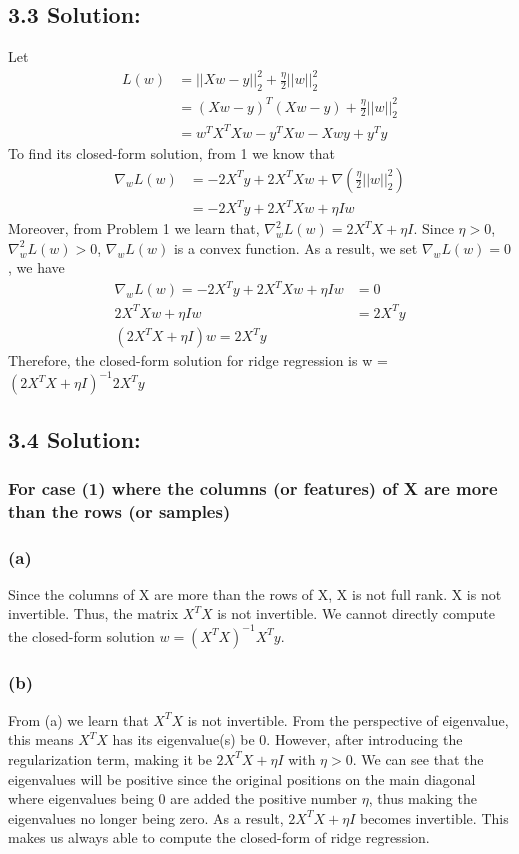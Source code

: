 \documentclass{article}
\begin{document}
\subsection*{3.3 Solution:}
Let
\begin{align*}
    L(w) &= ||Xw - y||_2^2 + \frac{\eta}{2} ||w||_2^2 \\
         &= (Xw - y)^T (Xw - y) + \frac{\eta}{2} ||w||_2^2 \\
         &= w^T X^T X w - y^T Xw - X w y + y^T y
\end{align*}
To find its closed-form solution, from 1 we know that 
\begin{align*}
    \nabla_w L(w) &= - 2 X^T y + 2 X^T X w + \nabla (\frac{\eta}{2} ||w||_2^2) \\
                &= - 2 X^T y + 2 X^T X w + \eta I w
\end{align*}
Moreover, from Problem 1 we learn that, $\nabla_w^2 L(w) = 2 X^T X + \eta I$. Since $\eta > 0$, $\nabla_w^2 L(w) > 0$, $\nabla_w L(w)$ is a convex function.
As a result, we set $\nabla_w L(w) = 0$, we have
\begin{align*}
        \nabla_w L(w) = - 2 X^T y + 2 X^T X w + \eta I w &= 0 \\
             2 X^T X w + \eta I w &= 2 X^T y \\
             (2 X^T X + \eta I) w = 2 X^T y
\end{align*}
Therefore, the closed-form solution for ridge regression is w = $(2 X^T X + \eta I)^{-1} 2 X^T y$

\subsection*{3.4 Solution:}
\subsubsection*{For case (1) where the columns (or features) of X are more than the rows (or samples)}
\subsubsection*{(a)}
Since the columns of X are more than the rows of X, X is not full rank. X is not invertible. Thus, the matrix $X^T X$ is not invertible. We cannot directly compute the closed-form solution $w = (X^T X)^{-1} X^T y$.
\subsubsection*{(b)}
From (a) we learn that $X^T X$ is not invertible. From the perspective of eigenvalue, this means $X^T X$ has its eigenvalue(s) be 0. However, after introducing the regularization term, making it be $2 X^T X + \eta I$ with $\eta > 0$. 
We can see that the eigenvalues will be positive since the original positions on the main diagonal where eigenvalues being 0 are added the positive number $\eta$, thus making the eigenvalues no longer being zero. As a result, $2 X^T X + \eta I$ becomes invertible. This makes us always able to compute the closed-form of ridge regression.
\end{document}
